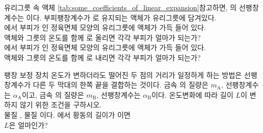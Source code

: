 \begin{practicebox*}{유리그릇 속 액체}
\autoref{tab:some_coefficients_of_linear_expansion}\을 참고하면,
의 선팽창계수는 이다.
부피팽창계수가 로 유지되는 액체가
유리그릇에 담겨있다. \\
%
\anset
\an {}에서 부피가
인 정육면체 모양의 유리그릇에 액체가 가득 들어 있다. \\
\ans 액체와 그릇의 온도를 함께 로 올리면 각각 부피가 얼마가 되는가? \\
\an {}에서 부피가
인 정육면체 모양의 유리그릇에 액체가 가득 들어 있다. \\
\ans 액체와 그릇의 온도를 함께 로 내리면 각각 부피가 얼마가 되는가?
\end{practicebox*}
\vspace{3cm}%

\begin{practicebox*}{팽창 보정 장치}
온도가 변하더라도 떨어진 두 점의 거리가 일정하게 하는 방법은 선팽창계수가 다른 두 막대의 한쪽 끝을
결합하는 것이다. 금속 의 질량은 $m_\text{A}$, 선팽창계수는 $\alpha_\text{A}$이고,
금속 의 질량은 $m_\text{B}$, 선팽창계수는 $\alpha_\text{B}$이다.
\anset
\an 온도변화에 따라 길이 $L$이 변하지 않기 위한 조건을 구하시오. \\
\an 물질 , 물질 이다.
에서 황동의 길이가
이면 \\
\ans $L$은 얼마인가?
\end{practicebox*}
\clearpage



\insertTeacherPages
{ %
\begin{solbox}
\bnset
{} \\
\end{solbox}

\begin{solbox}
\bnset
{} \\
\end{solbox}
} %
{ %
\begin{solbox}
\bnset
{} \\
\end{solbox}
} %
\clearpage